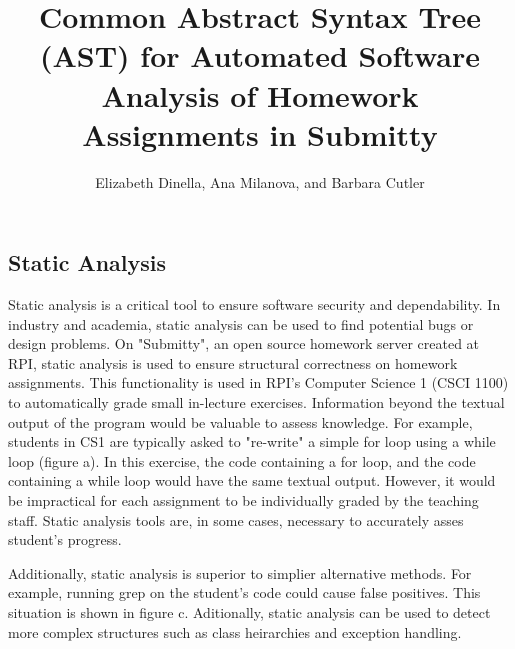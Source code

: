 \documentclass[thesis]{hmcposter}
\title{Common Abstract Syntax Tree (AST) for Automated Software Analysis of Homework Assignments in Submitty}
\author{Elizabeth Dinella, Ana Milanova, and Barbara Cutler}
\begin{document}
\begin{poster}

\section{Static Analysis}
Static analysis is a critical tool to ensure software security and dependability. In industry and academia, static analysis can be used to find potential bugs or design problems. On "Submitty", an open source homework server created at RPI, static analysis is used to ensure structural correctness on homework assignments. This functionality is used in RPI's Computer Science 1 (CSCI 1100) to automatically grade small in-lecture exercises. Information beyond the textual output of the program would be valuable to assess knowledge. For example, students in CS1 are typically asked to "re-write" a simple for loop using a while loop (figure a). In this exercise, the code containing a for loop, and the code containing a while loop would have the same textual output. However, it would be impractical for each assignment to be individually graded by the teaching staff. Static analysis tools are, in some cases, necessary to accurately asses student's progress.

Additionally, static analysis is superior to simplier alternative methods. For example, running grep on the student's code could cause false positives. This situation is shown in figure c. Aditionally, static analysis can be used to detect more complex structures such as class heirarchies and exception handling.

\begin{figure}
\begin{center}
\end{center}
\end{figure}


\end{poster}
\end{document}

